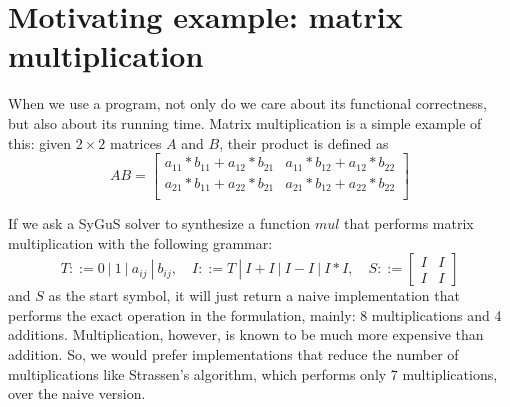 \section{Motivating example: matrix multiplication}
\label{sec:example}
When we use a program, not only do we care about its functional correctness, but also about its running time.
%
Matrix multiplication is a simple example of this: given $2 \times 2$ matrices $A$ and $B$, their product is defined as
%
\begin{equation}
    AB =
\begin{bmatrix}
a_{11} * b_{11} + a_{12} * b_{21} &
a_{11} * b_{12} + a_{12} * b_{22} \\
a_{21} * b_{11} + a_{22} * b_{21} &
a_{21} * b_{12} + a_{22} * b_{22} \\
\end{bmatrix}
\label{eqn:matrix-mul}
\end{equation}

%
If we ask a SyGuS solver to synthesize a function $mul$ that performs matrix multiplication with the following grammar:
%
\[
T ::= 0 \ | \ 1 \ | \ a_{ij} \ | \ b_{ij}, \quad
I ::= T \ | \ I + I \ | \ I - I \ | \ I * I, \quad
S ::=
\begin{bmatrix} I & I \\
I & I
\end{bmatrix}
\]
%
and $S$ as the start symbol, it will just return a naive implementation that performs the exact operation in the formulation, mainly: 8 multiplications and 4 additions.
%
Multiplication, however, is known to be much more expensive than addition.
%
So, we would prefer implementations that reduce the number of multiplications like Strassen's algorithm, which performs only 7 multiplications, over the naive version.
%
